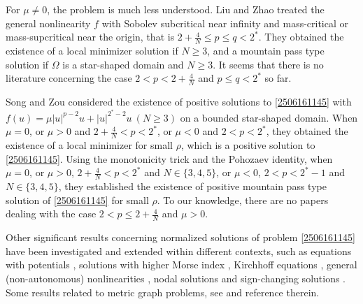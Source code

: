 \documentclass[10pt]{article}
\numberwithin{equation}{section}
\numberwithin{equation}{section}
\begin{document}
\medskip
{}
\medskip

For $\mu\neq 0$,  the  problem is much less understood. Liu and Zhao \cite{LZ25} treated  the general nonlinearity $f$ with Sobolev subcritical near infinity and mass-critical or mass-supcritical near the origin, that is $2+\frac{4}{N}\le p\le q<2^*$. They obtained the existence of a local minimizer solution if  $N\ge3$, and a mountain pass type solution if $\Omega$ is a star-shaped domain and $N\ge3$. It seems that there is no literature concerning the case $2<p<2+\frac{4}{N}$ and $p\le q<2^*$ so far.

\smallskip
Song and Zou \cite{SZarxiv25} considered the existence of positive solutions to \eqref{2506161145} with $f(u)=\mu |u|^{p-2}u+|u|^{2^*-2}u~(N\geq3)$ on a bounded star-shaped domain. When $\mu=0$, or $\mu>0$ and $2+\frac{4}{N}<p<2^*$, or $\mu<0$ and $2<p<2^*$, they obtained the existence of a local minimizer for small $\rho$, which is a positive solution to \eqref{2506161145}. Using the monotonicity trick and the Pohozaev identity, when $\mu=0$, or $\mu>0$, $2+\frac{4}{N}<p<2^*$ and $N\in\{3,4,5\}$, or $\mu<0$, $2<p<2^*-1$ and $N\in\{3,4,5\}$, they established the existence of positive mountain pass type solution of \eqref{2506161145} for small $\rho$. To our knowledge,  there are no papers dealing with the case $2<p \le 2+\frac{4}{N}$ and $\mu > 0$.


\medskip
{}
\medskip

Other significant results concerning normalized solutions of problem \eqref{2506161145} have been investigated and extended within different contexts, such as equations with potentials \cite{BQZ24, LM24, QZ24}, solutions with higher Morse index \cite{PD17}, Kirchhoff equations \cite{WC24}, general (non-autonomous) nonlinearities \cite{Song23}, nodal solutions \cite{DDGS2025} and sign-changing solutions \cite{SZ25}. Some results related to metric graph problems, see \cite{CLS24, Boni25} and reference therein.
\end{document}

